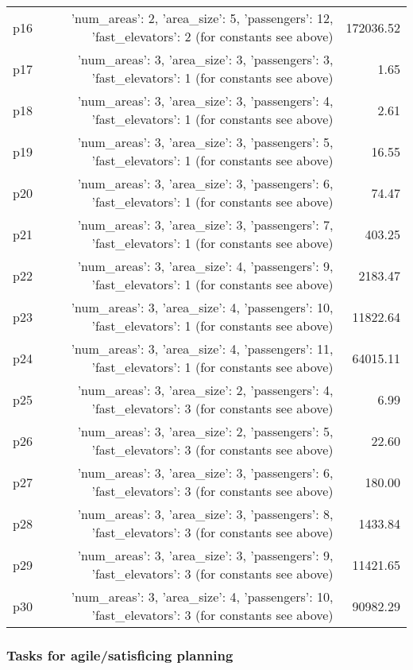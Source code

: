 \documentclass{article}
\begin{document}
\begin{center}
\begin{tabular}{@{}l|r|r@{}}
  p16&{'num\_areas': 2, 'area\_size': 5, 'passengers': 12, 'fast\_elevators': 2 (for constants see above)}&172036.52\\
  p17&{'num\_areas': 3, 'area\_size': 3, 'passengers': 3, 'fast\_elevators': 1 (for constants see above)}&1.65\\
  p18&{'num\_areas': 3, 'area\_size': 3, 'passengers': 4, 'fast\_elevators': 1 (for constants see above)}&2.61\\
  p19&{'num\_areas': 3, 'area\_size': 3, 'passengers': 5, 'fast\_elevators': 1 (for constants see above)}&16.55\\
  p20&{'num\_areas': 3, 'area\_size': 3, 'passengers': 6, 'fast\_elevators': 1 (for constants see above)}&74.47\\
  p21&{'num\_areas': 3, 'area\_size': 3, 'passengers': 7, 'fast\_elevators': 1 (for constants see above)}&403.25\\
  p22&{'num\_areas': 3, 'area\_size': 4, 'passengers': 9, 'fast\_elevators': 1 (for constants see above)}&2183.47\\
  p23&{'num\_areas': 3, 'area\_size': 4, 'passengers': 10, 'fast\_elevators': 1 (for constants see above)}&11822.64\\
  p24&{'num\_areas': 3, 'area\_size': 4, 'passengers': 11, 'fast\_elevators': 1 (for constants see above)}&64015.11\\
  p25&{'num\_areas': 3, 'area\_size': 2, 'passengers': 4, 'fast\_elevators': 3 (for constants see above)}&6.99\\
  p26&{'num\_areas': 3, 'area\_size': 2, 'passengers': 5, 'fast\_elevators': 3 (for constants see above)}&22.60\\
  p27&{'num\_areas': 3, 'area\_size': 3, 'passengers': 6, 'fast\_elevators': 3 (for constants see above)}&180.00\\
  p28&{'num\_areas': 3, 'area\_size': 3, 'passengers': 8, 'fast\_elevators': 3 (for constants see above)}&1433.84\\
  p29&{'num\_areas': 3, 'area\_size': 3, 'passengers': 9, 'fast\_elevators': 3 (for constants see above)}&11421.65\\
  p30&{'num\_areas': 3, 'area\_size': 4, 'passengers': 10, 'fast\_elevators': 3 (for constants see above)}&90982.29
                            \end{tabular}
                            \end{center}
                    

                                \subsubsection*{Tasks for agile/satisficing planning}
                                
\end{document}
